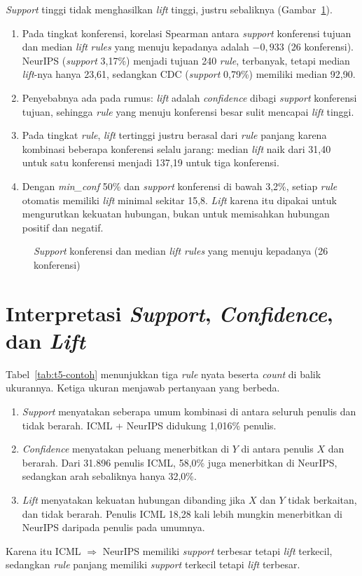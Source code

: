 \textit{Support} tinggi tidak menghasilkan \textit{lift} tinggi, justru sebaliknya (Gambar~\ref{fig:t5-lift-konferensi}).
\begin{enumerate}
\item Pada tingkat konferensi, korelasi Spearman antara \textit{support} konferensi tujuan dan median \textit{lift} \textit{rules} yang menuju kepadanya adalah $-0{,}933$ (26 konferensi). NeurIPS (\textit{support} 3,17\%) menjadi tujuan 240 \textit{rule}, terbanyak, tetapi median \textit{lift}-nya hanya 23,61, sedangkan CDC (\textit{support} 0,79\%) memiliki median 92,90.
\item Penyebabnya ada pada rumus: \textit{lift} adalah \textit{confidence} dibagi \textit{support} konferensi tujuan, sehingga \textit{rule} yang menuju konferensi besar sulit mencapai \textit{lift} tinggi.
\item Pada tingkat \textit{rule}, \textit{lift} tertinggi justru berasal dari \textit{rule} panjang karena kombinasi beberapa konferensi selalu jarang: median \textit{lift} naik dari 31,40 untuk satu konferensi menjadi 137,19 untuk tiga konferensi.
\item Dengan \textit{min\_conf} 50\% dan \textit{support} konferensi di bawah 3,2\%, setiap \textit{rule} otomatis memiliki \textit{lift} minimal sekitar 15,8. \textit{Lift} karena itu dipakai untuk mengurutkan kekuatan hubungan, bukan untuk memisahkan hubungan positif dan negatif.
\end{enumerate}

\begin{figure}[!htb]
\centering
{}
\caption{\textit{Support} konferensi dan median \textit{lift} \textit{rules} yang menuju kepadanya (26 konferensi)}
\label{fig:t5-lift-konferensi}
\end{figure}

\section{Interpretasi \textit{Support}, \textit{Confidence}, dan \textit{Lift}}
\label{sec:hasil-t5-metrik}
Tabel~\ref{tab:t5-contoh} menunjukkan tiga \textit{rule} nyata beserta \textit{count} di balik ukurannya. Ketiga ukuran menjawab pertanyaan yang berbeda.
\begin{enumerate}
\item \textit{Support} menyatakan seberapa umum kombinasi di antara seluruh penulis dan tidak berarah. ICML + NeurIPS didukung 1,016\% penulis.
\item \textit{Confidence} menyatakan peluang menerbitkan di $Y$ di antara penulis $X$ dan berarah. Dari 31.896 penulis ICML, 58,0\% juga menerbitkan di NeurIPS, sedangkan arah sebaliknya hanya 32,0\%.
\item \textit{Lift} menyatakan kekuatan hubungan dibanding jika $X$ dan $Y$ tidak berkaitan, dan tidak berarah. Penulis ICML 18,28 kali lebih mungkin menerbitkan di NeurIPS daripada penulis pada umumnya.
\end{enumerate}
Karena itu ICML $\Rightarrow$ NeurIPS memiliki \textit{support} terbesar tetapi \textit{lift} terkecil, sedangkan \textit{rule} panjang memiliki \textit{support} terkecil tetapi \textit{lift} terbesar.

